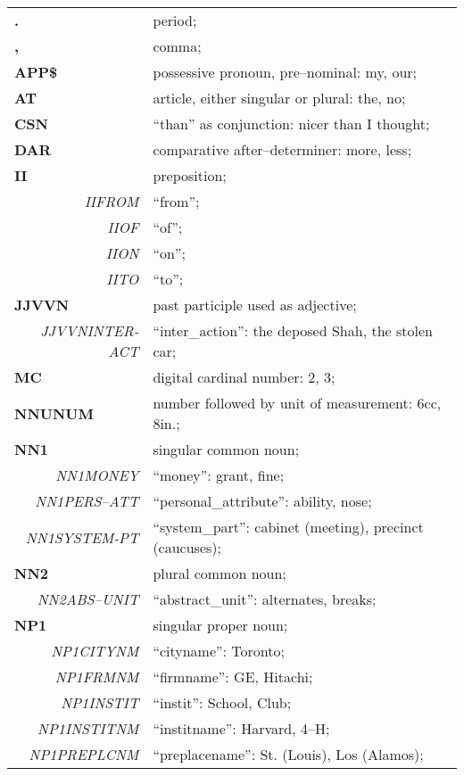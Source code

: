 \renewcommand{\arraystretch}{}
\begin{tabular}{lll}
{\bf .} & & period;\\ 
{\bf ,} & & comma;\\ 
{\bf APP\$} & & possessive pronoun, pre--nominal: my, our;\\ 
{\bf AT} & & article, either singular or plural: the, no;\\ 
{\bf CSN} & & ``than'' as conjunction: nicer than I thought;\\ 
{\bf DAR} & & comparative after--determiner: more, less;\\ 
{\bf II} & & preposition;\\
\multicolumn{2}{r}{\em IIFROM} & ``from'';\\ 
\multicolumn{2}{r}{\em IIOF} & ``of'';\\ 
\multicolumn{2}{r}{\em IION} & ``on'';\\ 
\multicolumn{2}{r}{\em IITO} & ``to'';\\ 
{\bf JJVVN} & & past participle used as adjective;\\ 
\multicolumn{2}{r}{\em JJVVNINTER-ACT} & ``inter\_action'': the deposed Shah, the stolen car;\\
{\bf MC} & & digital cardinal number: 2, 3;\\ 
{\bf NNUNUM} & & number followed by unit of measurement: 6cc, 8in.;\\ 
{\bf NN1} & & singular common noun;\\ 
\multicolumn{2}{r}{\em NN1MONEY} & ``money'': grant, fine;\\ 
\multicolumn{2}{r}{\em NN1PERS--ATT} & ``personal\_attribute'': ability, nose;\\ 
\multicolumn{2}{r}{\em NN1SYSTEM-PT} & ``system\_part'': cabinet (meeting), precinct (caucuses);\\ 
{\bf NN2} & & plural common noun;\\ 
\multicolumn{2}{r}{\em NN2ABS--UNIT} & ``abstract\_unit'': alternates, breaks;\\ 
{\bf NP1} & & singular proper noun;\\ 
\multicolumn{2}{r}{\em NP1CITYNM} & ``cityname'': Toronto;\\ 
\multicolumn{2}{r}{\em NP1FRMNM} & ``firmname'': GE, Hitachi;\\ 
\multicolumn{2}{r}{\em NP1INSTIT} & ``instit'': School, Club;\\ 
\multicolumn{2}{r}{\em NP1INSTITNM} & ``institname'': Harvard, 4--H;\\ 
\multicolumn{2}{r}{\em NP1PREPLCNM} & ``preplacename'': St. (Louis), Los (Alamos);\\ 

\end{tabular}
